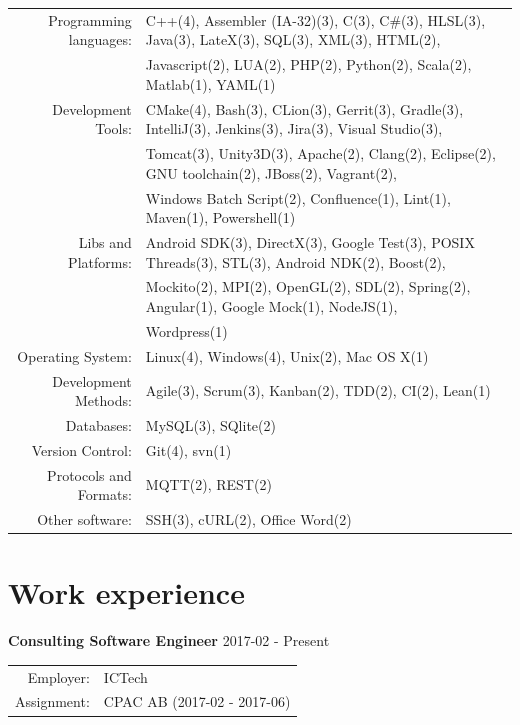 \documentclass[a4paper,10pt]{article}
\begin{document}
\begin{tabular}{rl}
Programming languages:&
C++(4),
Assembler (IA-32)(3),
C(3),
C\#(3),
HLSL(3),
Java(3),
LateX(3),
SQL(3),
XML(3),
HTML(2),\\&
Javascript(2),
LUA(2),
PHP(2),
Python(2),
Scala(2),
Matlab(1),
YAML(1)\\

Development Tools:&
CMake(4),
Bash(3),
CLion(3),
Gerrit(3),
Gradle(3),
IntelliJ(3),
Jenkins(3),
Jira(3),
Visual Studio(3),\\&
Tomcat(3),
Unity3D(3),
Apache(2),
Clang(2),
Eclipse(2),
GNU toolchain(2),
JBoss(2),
Vagrant(2),\\&
Windows Batch Script(2),
Confluence(1),
Lint(1),
Maven(1),
Powershell(1)\\

Libs and Platforms:&
Android SDK(3),
DirectX(3),
Google Test(3),
POSIX Threads(3),
STL(3),
Android NDK(2),
Boost(2),\\&
Mockito(2),
MPI(2),
OpenGL(2),
SDL(2),
Spring(2),
Angular(1),
Google Mock(1),
NodeJS(1),\\&
Wordpress(1)\\

Operating System:&
Linux(4),
Windows(4),
Unix(2),
Mac OS X(1)\\

Development Methods:&
Agile(3),
Scrum(3),
Kanban(2),
TDD(2),
CI(2),
Lean(1)\\

Databases:&
MySQL(3),
SQlite(2)\\

Version Control:&
Git(4),
svn(1)\\

Protocols and Formats:&
MQTT(2),
REST(2)\\

Other software:&
SSH(3),
cURL(2),
Office Word(2)\\
\end{tabular}

\section{Work experience}

\textbf{Consulting Software Engineer} 2017-02 - Present \\
\begin{tabular}{rl}
Employer:& ICTech\\
Assignment:& CPAC AB (2017-02 - 2017-06)
\end{tabular}\\
\end{document}

